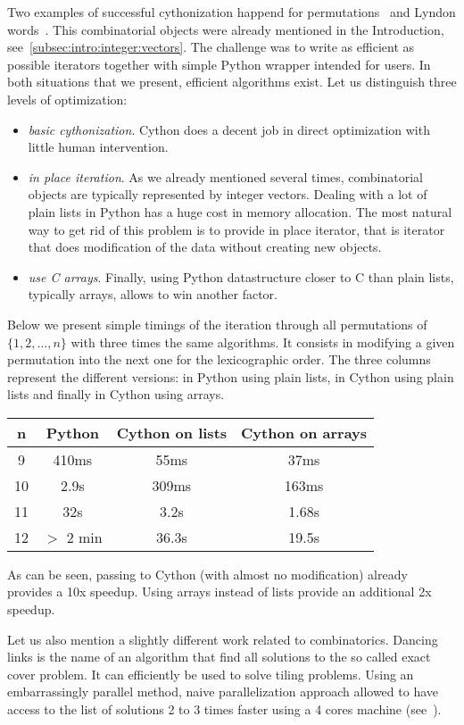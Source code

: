 \documentclass{deliverablereport}
\begin{document}
Two examples of successful cythonization happend for
permutations~\cite{trac-23734} and Lyndon words~\cite{trac-26111}.
This combinatorial objects were already mentioned in the
Introduction, see~\ref{subsec:intro:integer:vectors}.
The challenge was to write as efficient as possible iterators
together with simple Python wrapper intended for \Sage users.
In both situations that we present, efficient algorithms exist.
Let us distinguish three levels of optimization:
\begin{itemize}
\item \textit{basic cythonization}. Cython does a decent job in
direct optimization with little human intervention. 
\item \textit{in place iteration}. As we already mentioned several
times, combinatorial objects are typically represented by
integer vectors. Dealing with a lot of plain lists in Python has a huge
cost in memory allocation. The most natural way to get rid of
this problem is to provide in place iterator, that is iterator that does
modification of the data without creating new objects.
\item \textit{use C arrays}. Finally, using Python datastructure closer to C
than plain lists, typically arrays, allows to win another factor.
\end{itemize}
Below we present simple timings of the iteration through all permutations
of $\{1, 2, \ldots, n\}$ with three times the same algorithms. It consists
in modifying a given permutation into the next one for the lexicographic
order. The three columns represent the different versions: in Python
using plain lists, in Cython using plain lists and finally in Cython
using arrays.
\begin{center}\begin{tabular}{c|c|c|c}
n & Python & Cython on lists & Cython on arrays \\
\hline
9  & 410ms   & 55ms  & 37ms \\
10 & 2.9s    & 309ms & 163ms \\
11 & 32s     & 3.2s  & 1.68s \\
12 & $>$ 2 min & 36.3s & 19.5s \\
\end{tabular}\end{center}
As can be seen, passing to Cython (with almost no modification) already
provides a 10x speedup. Using arrays instead of lists provide an
additional 2x speedup.

Let us also mention a slightly different work related to combinatorics.
Dancing links is the name of an algorithm that find all solutions to
the so called exact cover problem. It can efficiently be used to
solve tiling problems. Using an embarrassingly parallel method,
naive parallelization approach allowed to have access to the list
of solutions 2 to 3 times faster using a 4 cores machine
(see~\cite{trac-25125}).
\end{document}
